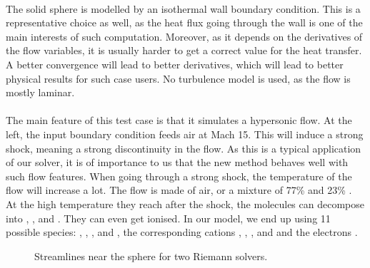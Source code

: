         \paragraph{}
        The solid sphere is modelled by an isothermal wall boundary condition.
        This is a representative choice as well, as the heat flux going through the wall is one of the main interests of such computation.
        Moreover, as it depends on the derivatives of the flow variables, it is usually harder to get a correct value for the heat transfer.
        A better convergence will lead to better derivatives, which will lead to better physical results for such case users.
        No turbulence model is used, as the flow is mostly laminar.

        \paragraph{}
        The main feature of this test case is that it simulates a hypersonic flow.
        At the left, the input boundary condition feeds air at Mach 15.
        This will induce a strong shock, meaning a strong discontinuity in the flow.
        As this is a typical application of our solver, it is of importance to us that the new method behaves well with such flow features.
        When going through a strong shock, the temperature of the flow will increase a lot.
        The flow is made of air, or a mixture of 77\%  and 23\% .
        At the high temperature they reach after the shock, the molecules can decompose into , , and .
        They can even get ionised.
        In our model, we end up using 11 possible species: , , ,  and , the corresponding cations , , ,  and  and the electrons .

        \begin{figure}
          \centering
          \caption{ Streamlines near the sphere for two Riemann solvers.}
          \label{fig:sphere_carbuncle}
        \end{figure}


